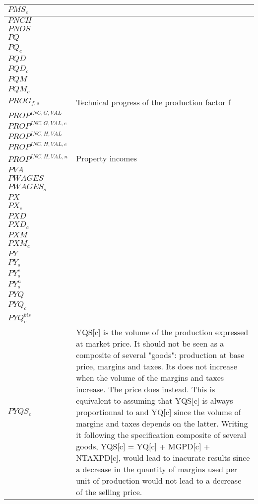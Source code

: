 \documentclass[12pt]{article}
\numberwithin{equation}{section}
\begin{document}
\begin{longtable}{@{}p{4cm}p{9cm}@{}}
$PMS_{c}$ &  \\
 \midrule 
$PNCH$ &  \\
 \midrule 
$PNOS$ &  \\
 \midrule 
$PQ$ &  \\
 \midrule 
$PQ_{c}$ &  \\
 \midrule 
$PQD$ &  \\
 \midrule 
$PQD_{c}$ &  \\
 \midrule 
$PQM$ &  \\
 \midrule 
$PQM_{c}$ &  \\
 \midrule 
$PROG_{f, s}$ & Technical progress of the production factor f \\
 \midrule 
$PROP^{INC,G,VAL}$ &  \\
 \midrule 
$PROP^{INC,G,VAL,e}$ &  \\
 \midrule 
$PROP^{INC,H,VAL}$ &  \\
 \midrule 
$PROP^{INC,H,VAL,e}$ &  \\
 \midrule 
$PROP^{INC,H,VAL,n}$ & Property incomes \\
 \midrule 
$PVA$ &  \\
 \midrule 
$PWAGES$ &  \\
 \midrule 
$PWAGES_{s}$ &  \\
 \midrule 
$PX$ &  \\
 \midrule 
$PX_{c}$ &  \\
 \midrule 
$PXD$ &  \\
 \midrule 
$PXD_{c}$ &  \\
 \midrule 
$PXM$ &  \\
 \midrule 
$PXM_{c}$ &  \\
 \midrule 
$PY$ &  \\
 \midrule 
$PY_{s}$ &  \\
 \midrule 
$PY^{e}_{s}$ &  \\
 \midrule 
$PY^{n}_{s}$ &  \\
 \midrule 
$PYQ$ &  \\
 \midrule 
$PYQ_{c}$ &  \\
 \midrule 
$PYQ^{bis}_{c}$ &  \\
 \midrule 
$PYQS_{c}$ & YQS[c] is the volume of the production expressed at market price. It should not be seen as a composite of several "goods": production at base price, margins and taxes. Its does not increase when the volume of the margins and taxes increase. The price does instead. This is equivalent to assuming that YQS[c] is always proportionnal to and YQ[c] since the volume of margins and taxes depends on the latter. Writing it following the specification composite of several goods, YQS[c] = YQ[c] + MGPD[c] + NTAXPD[c], would lead to inacurate results since a decrease in the quantity of margins used per unit of production would not lead to a decrease of the selling price. \\

\end{longtable}
\end{document}
